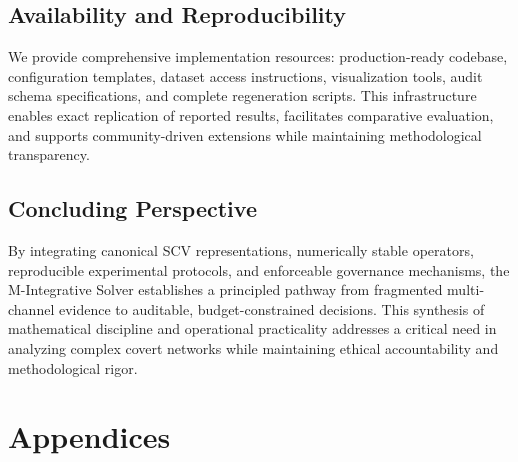 \documentclass[12pt]{article}
\theoremstyle{plain}
\begin{document}
\subsection{Availability and Reproducibility}
We provide comprehensive implementation resources: production-ready codebase, configuration templates, dataset access instructions, visualization tools, audit schema specifications, and complete regeneration scripts. This infrastructure enables exact replication of reported results, facilitates comparative evaluation, and supports community-driven extensions while maintaining methodological transparency.

\subsection{Concluding Perspective}
By integrating canonical SCV representations, numerically stable operators, reproducible experimental protocols, and enforceable governance mechanisms, the M-Integrative Solver establishes a principled pathway from fragmented multi-channel evidence to auditable, budget-constrained decisions. This synthesis of mathematical discipline and operational practicality addresses a critical need in analyzing complex covert networks while maintaining ethical accountability and methodological rigor.

\appendix

\section*{Appendices}
\end{document}
